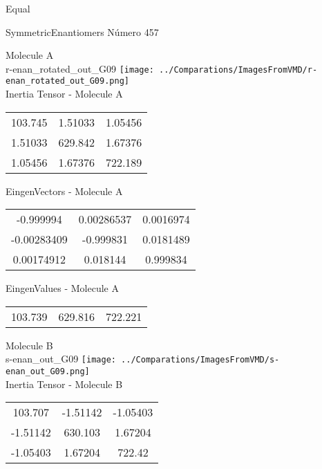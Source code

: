 \begin{center}
\vtab
\vtab
\textcolor{NavyBlue}{\Large Equal}
\end{center}

 \newpage

\vtab[-2cm]
\begin{center}
{\large SymmetricEnantiomers \tab Número 457}
\end{center}
\begin{multicols}{2}
\begin{center}

Molecule A \\ 
r-enan\_rotated\_out\_G09
\texttt{[image: ../Comparations/ImagesFromVMD/r-enan\_rotated\_out\_G09.png]}
\\
Inertia Tensor - Molecule A \\
\vtab

\begin{tabular}{|c c c|}
103.745	 & 	1.51033	 & 	1.05456	 \\
1.51033	 & 	629.842	 & 	1.67376	 \\
1.05456	 & 	1.67376	 & 	722.189
\end{tabular}

\vtab
 EingenVectors - Molecule A     \\
\vtab
\begin{tabular}{|c c c|}
-0.999994	 & 	0.00286537	 & 	0.0016974	 \\
-0.00283409	 & 	-0.999831	 & 	0.0181489	 \\
0.00174912	 & 	0.018144	 & 	0.999834
\end{tabular}

\vtab
 EingenValues - Molecule A     \\
\vtab
\begin{tabular}{|c c c|}
103.739	 & 	629.816	 & 	722.221	 \\
\end{tabular}
\columnbreak

Molecule B \\ 
s-enan\_out\_G09
\texttt{[image: ../Comparations/ImagesFromVMD/s-enan\_out\_G09.png]}
\\
Inertia Tensor - Molecule B \\
\vtab

\begin{tabular}{|c c c|}
103.707	 & 	-1.51142	 & 	-1.05403	 \\
-1.51142	 & 	630.103	 & 	1.67204	 \\
-1.05403	 & 	1.67204	 & 	722.42
\end{tabular}


\end{center}
\end{multicols}
